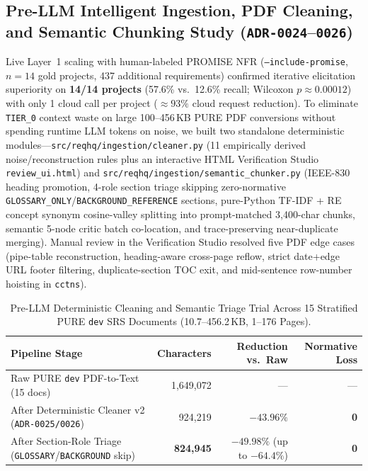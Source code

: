 \documentclass[11pt,a4paper]{article}
\begin{document}
\subsection{Pre-LLM Intelligent Ingestion, PDF Cleaning, and Semantic Chunking Study (\texttt{ADR-0024}--\texttt{0026})}
Live Layer~1 scaling with human-labeled PROMISE NFR (\texttt{--include-promise}, $n=14$ gold projects, 437 additional requirements) confirmed iterative elicitation superiority on \textbf{14/14 projects} (57.6\% vs.\ 12.6\% recall; Wilcoxon $p \approx 0.00012$) with only 1 cloud call per project ($\approx 93\%$ cloud request reduction). To eliminate \texttt{TIER\_0} context waste on large 100--456\,KB PURE PDF conversions without spending runtime LLM tokens on noise, we built two standalone deterministic modules---\texttt{src/reqhq/ingestion/cleaner.py} (11 empirically derived noise/reconstruction rules plus an interactive HTML Verification Studio \texttt{review\_ui.html}) and \texttt{src/reqhq/ingestion/semantic\_chunker.py} (IEEE-830 heading promotion, 4-role section triage skipping zero-normative \texttt{GLOSSARY\_ONLY}/\texttt{BACKGROUND\_REFERENCE} sections, pure-Python TF-IDF + RE concept synonym cosine-valley splitting into prompt-matched 3{,}400-char chunks, semantic 5-node critic batch co-location, and trace-preserving near-duplicate merging). Manual review in the Verification Studio resolved five PDF edge cases (pipe-table reconstruction, heading-aware cross-page reflow, strict date+edge URL footer filtering, duplicate-section TOC exit, and mid-sentence row-number hoisting in \texttt{cctns}).

\begin{table}[h]
\centering
\caption{Pre-LLM Deterministic Cleaning and Semantic Triage Trial Across 15 Stratified PURE \texttt{dev} SRS Documents (10.7--456.2\,KB, 1--176 Pages).}
\label{tab:prellm-cleaning-semantic}
\begin{tabular}{@{}lrrr@{}}
\toprule
\textbf{Pipeline Stage} & \textbf{Characters} & \textbf{Reduction vs.\ Raw} & \textbf{Normative Loss} \\
\midrule
Raw PURE \texttt{dev} PDF-to-Text (15 docs) & 1{,}649{,}072 & --- & --- \\
After Deterministic Cleaner v2 (\texttt{ADR-0025/0026}) & 924{,}219 & $-43.96\%$ & \textbf{0} \\
After Section-Role Triage (\texttt{GLOSSARY}/\texttt{BACKGROUND} skip) & \textbf{824{,}945} & \textbf{$-49.98\%$} (up to $-64.4\%$) & \textbf{0} \\
\bottomrule
\end{tabular}
\end{table}
\end{document}

